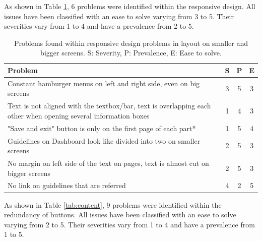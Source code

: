 \documentclass{sigchi}
\begin{document}
As shown in Table \ref{tab:responsiveDesign}, 6 problems were identified within the responsive design. All issues have been classified with an ease to solve varying from 3 to 5. Their severities vary from 1 to 4 and have a prevalence from 2 to 5.

\begin{table}[H]
    \centering
    \begin{tabular}{|m{6.5cm}|c|c|c|}
    \hline
        \textbf{Problem} & \textbf{S} & \textbf{P} & \textbf{E}\\
    \hline
         Constant hamburger menus on left and right side, even on big screens & 3 & 5 & 3\\
    \hline
         Text is not aligned with the textbox/bar, text is overlapping each other when opening several information boxes & 1 & 4 & 3\\
    \hline
         "Save and exit" button is only on the first page of each part* & 1 & 5 & 4\\
    \hline
         Guidelines on Dashboard look like divided into two on smaller screens & 2 & 5 & 3\\
    \hline
         No margin on left side of the text on pages, text is almost cut on bigger screens & 2 & 5 & 3\\
    \hline
         No link on guidelines that are referred & 4 & 2 & 5\\
    \hline
    \end{tabular}
    \caption{Problems found within responsive design problems in layout on smaller and bigger screens. S: Severity, P: Prevalence, E: Ease to solve.}
    \label{tab:responsiveDesign}
\end{table}

As shown in Table \ref{tab:content}, 9 problems were identified within the redundancy of buttons. All issues have been classified with an ease to solve varying from 2 to 5. Their severities vary from 1 to 4 and have a prevalence from 1 to 5.
\end{document}
